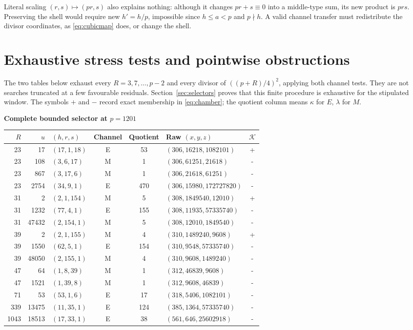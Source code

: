 \documentclass[11pt]{article}
\theoremstyle{remark}\newtheorem{remark}[theorem]{Remark}
\begin{document}
Literal scaling $(r,s)\mapsto(pr,s)$ also explains nothing: although it changes $pr+s\equiv0$ into a middle-type sum, its new product is $prs$. Preserving the shell would require new $h'=h/p$, impossible since $h\le a<p$ and $p\nmid h$. A valid channel transfer must redistribute the divisor coordinates, as \eqref{eq:cubicmap} does, or change the shell.

\section{Exhaustive stress tests and pointwise obstructions}\label{sec:stress}
The two tables below exhaust every $R=3,7,\ldots,p-2$ and every divisor of $((p+R)/4)^2$, applying both channel tests. They are not searches truncated at a few favourable residuals. Section~\ref{sec:selectors} proves that this finite procedure is exhaustive for the stipulated window. The symbols $+$ and $-$ record exact membership in \eqref{eq:chamber}; the quotient column means $\kappa$ for $E$, $\lambda$ for $M$.

\begin{center}
\begin{minipage}{\textwidth}
\centering\small
\textbf{Complete bounded selector at $p=1201$}\\[4pt]
\begin{tabular}{@{}rrlcclc@{}}
\toprule
$R$&$u$&$(h,r,s)$&Channel&Quotient&Raw $(x,y,z)$&$\mathcal K$\\
\midrule
23&17&$(17,1,18)$&E&53&$(306,16218,1082101)$&+\\
23&108&$(3,6,17)$&M&1&$(306,61251,21618)$&-\\
23&867&$(3,17,6)$&M&1&$(306,21618,61251)$&-\\
23&2754&$(34,9,1)$&E&470&$(306,15980,172727820)$&-\\
31&2&$(2,1,154)$&M&5&$(308,1849540,12010)$&+\\
31&1232&$(77,4,1)$&E&155&$(308,11935,57335740)$&-\\
31&47432&$(2,154,1)$&M&5&$(308,12010,1849540)$&-\\
39&2&$(2,1,155)$&M&4&$(310,1489240,9608)$&+\\
39&1550&$(62,5,1)$&E&154&$(310,9548,57335740)$&-\\
39&48050&$(2,155,1)$&M&4&$(310,9608,1489240)$&-\\
47&64&$(1,8,39)$&M&1&$(312,46839,9608)$&-\\
47&1521&$(1,39,8)$&M&1&$(312,9608,46839)$&-\\
71&53&$(53,1,6)$&E&17&$(318,5406,1082101)$&-\\
339&13475&$(11,35,1)$&E&124&$(385,1364,57335740)$&-\\
1043&18513&$(17,33,1)$&E&38&$(561,646,25602918)$&-\\
\bottomrule
\end{tabular}
\end{minipage}
\end{center}
\end{document}
